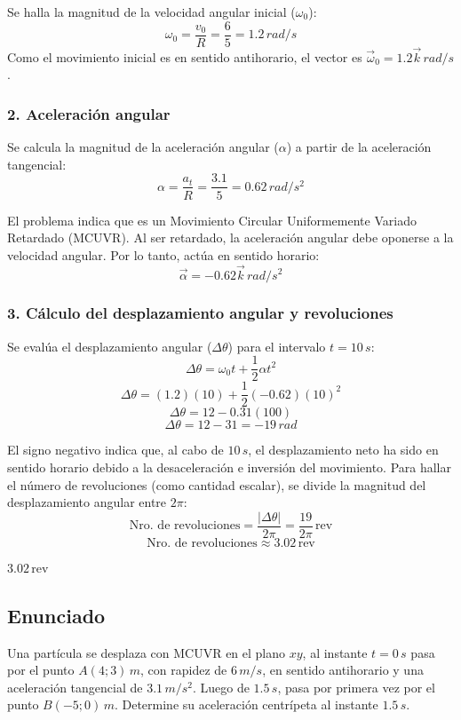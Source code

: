 \documentclass[12pt, a4paper]{article}
\begin{document}
Se halla la magnitud de la velocidad angular inicial ($\omega_0$):
$$ \omega_0 = \frac{v_0}{R} = \frac{6}{5} = 1.2 \, \si{rad/s} $$
Como el movimiento inicial es en sentido antihorario, el vector es $\vec{\omega}_0 = 1.2\vec{k} \, \si{rad/s}$.

\subsubsection*{2. Aceleración angular}
Se calcula la magnitud de la aceleración angular ($\alpha$) a partir de la aceleración tangencial:
$$ \alpha = \frac{a_t}{R} = \frac{3.1}{5} = 0.62 \, \si{rad/s^2} $$

El problema indica que es un Movimiento Circular Uniformemente Variado Retardado (MCUVR). Al ser retardado, la aceleración angular debe oponerse a la velocidad angular. Por lo tanto, actúa en sentido horario:
$$ \vec{\alpha} = -0.62\vec{k} \, \si{rad/s^2} $$

\subsubsection*{3. Cálculo del desplazamiento angular y revoluciones}
Se evalúa el desplazamiento angular ($\Delta\theta$) para el intervalo $t = 10 \, \si{s}$:
$$ \Delta\theta = \omega_0 t + \frac{1}{2}\alpha t^2 $$
$$ \Delta\theta = (1.2)(10) + \frac{1}{2}(-0.62)(10)^2 $$
$$ \Delta\theta = 12 - 0.31(100) $$
$$ \Delta\theta = 12 - 31 = -19 \, \si{rad} $$

El signo negativo indica que, al cabo de $10 \, \si{s}$, el desplazamiento neto ha sido en sentido horario debido a la desaceleración e inversión del movimiento.
Para hallar el número de revoluciones (como cantidad escalar), se divide la magnitud del desplazamiento angular entre $2\pi$:
$$ \text{Nro. de revoluciones} = \frac{|\Delta\theta|}{2\pi} = \frac{19}{2\pi} \, \text{rev} $$
$$ \text{Nro. de revoluciones} \approx 3.02 \, \text{rev} $$

\begin{tcolorbox}[colback=green!5!white, colframe=green!50!black, title=Respuesta Final]
\centering \Large $3.02 \, \text{rev}$
\end{tcolorbox}

\newpage

\subsection*{Enunciado}
Una partícula se desplaza con MCUVR en el plano $xy$, al instante $t = 0 \, \si{s}$ pasa por el punto $A(4; 3) \, \si{m}$, con rapidez de $6 \, \si{m/s}$, en sentido antihorario y una aceleración tangencial de $3.1 \, \si{m/s^2}$. Luego de $1.5 \, \si{s}$, pasa por primera vez por el punto $B(-5; 0) \, \si{m}$. Determine su aceleración centrípeta al instante $1.5 \, \si{s}$.
\end{document}
